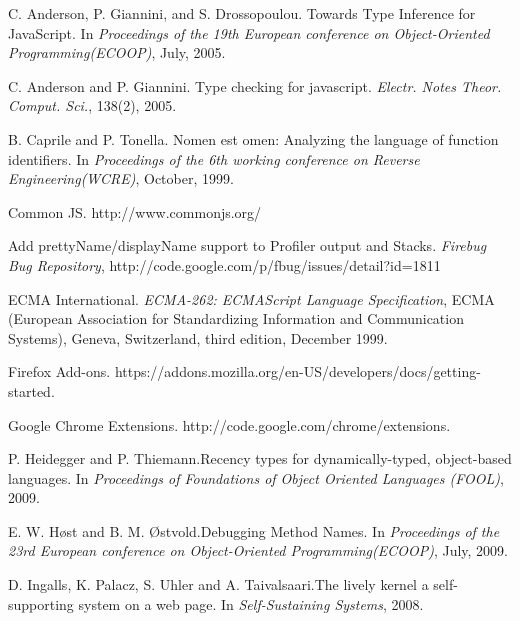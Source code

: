 \documentclass[10pt, preprint]{sigplanconf}
\begin{document}
\begin{thebibliography}{}
\softraggedright


C. Anderson, P. Giannini, and S. Drossopoulou. \newblock Towards Type Inference for JavaScript.
\newblock In \emph{Proceedings of the 19th European conference on Object-Oriented Programming(ECOOP)},
July, 2005.

C. Anderson and P. Giannini. \newblock Type checking for javascript.
\newblock \emph{Electr. Notes Theor. Comput. Sci.}, 138(2), 2005. 

B. Caprile and P. Tonella. \newblock Nomen est omen: Analyzing the language of function identifiers.
\newblock In \emph{Proceedings of the 6th working conference on Reverse Engineering(WCRE)},
October, 1999.

Common JS.
\newblock http://www.commonjs.org/

Add prettyName/displayName support to Profiler output and Stacks.
\newblock \emph{Firebug Bug Repository},
\newblock http://code.google.com/p/fbug/issues/detail?id=1811

ECMA International.
\newblock \emph{ECMA-262: ECMAScript Language Specification},
ECMA (European Association for Standardizing Information
and Communication Systems), Geneva, Switzerland, third edition,
December 1999. 

Firefox Add-ons.
\newblock https://addons.mozilla.org/en-US/developers/docs/getting-started.

Google Chrome Extensions.
\newblock http://code.google.com/chrome/extensions.

P. Heidegger and P. Thiemann.\newblock Recency types for dynamically-typed, object-based languages.
\newblock In \emph{Proceedings of Foundations of Object Oriented Languages (FOOL)},
2009.

E. W. H{\o}st and  B. M. {\O}stvold.\newblock Debugging Method Names.
\newblock In \emph{Proceedings of the 23rd European conference on Object-Oriented Programming(ECOOP)},
July, 2009.

D. Ingalls, K. Palacz, S. Uhler and A. Taivalsaari.\newblock The lively kernel a self-supporting system on
a web page.
\newblock In \emph{Self-Sustaining Systems},
2008.


\end{thebibliography}
\end{document}

